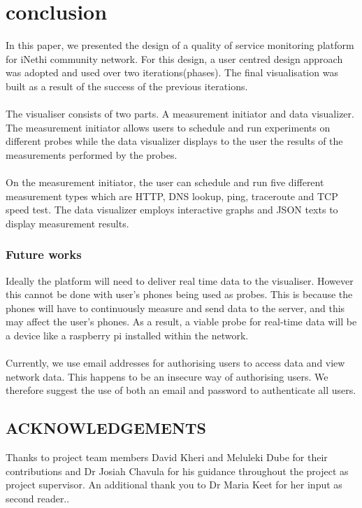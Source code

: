 \section{conclusion}
In this paper, we presented the design of a quality of service monitoring platform for iNethi community network. For this design, a user centred design approach was adopted and used over two iterations(phases). The final visualisation was built as a result of the success of the previous iterations.
\paragraph{}
The visualiser consists of two parts. A measurement initiator and data visualizer. The measurement initiator allows users to schedule and run experiments on different probes while the data visualizer displays to the user the results of the measurements performed by the probes. 
\paragraph{}
On the measurement initiator, the user can schedule and run five different measurement types which are HTTP, DNS lookup, ping, traceroute and TCP speed test. The data visualizer employs interactive graphs and JSON texts to display measurement results.
\subsubsection{Future works}
Ideally the platform will need to deliver real time data to the visualiser. However this cannot be done with user's phones being used as probes. This is because the phones will have to continuously measure and send data to the server, and this may affect the user's phones. As a result, a viable probe for real-time data will be a device like a raspberry pi installed within the network.
\paragraph{}
Currently, we use email addresses for authorising users to access data and view network data. This happens to be an insecure way of authorising users. We therefore suggest the use of both an email and password to authenticate all users.
\subsection{ACKNOWLEDGEMENTS}
Thanks to project team members David Kheri and Meluleki Dube for their contributions and Dr Josiah Chavula for his guidance throughout the project as project supervisor. An additional thank you to Dr Maria Keet for her input as second reader.. 